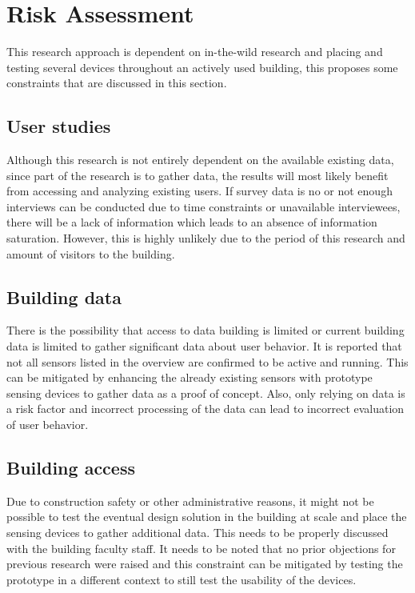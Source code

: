 \section{Risk Assessment}

This research approach is dependent on in-the-wild research and placing and testing several devices throughout an actively used building, this proposes some constraints that are discussed in this section.

\subsection{User studies}

Although this research is not entirely dependent on the available existing data, since part of the research is to gather data, the results will most likely benefit from accessing and analyzing existing users. If survey data is no or not enough interviews can be conducted due to time constraints or unavailable interviewees, there will be a lack of information which leads to an absence of information saturation. However, this is highly unlikely due to the period of this research and amount of visitors to the building.

\subsection{Building data}

There is the possibility that access to data building is limited or current building data is limited to gather significant data about user behavior. It is reported that not all sensors listed in the overview are confirmed to be active and running. This can be mitigated by enhancing the already existing sensors with prototype sensing devices to gather data as a proof of concept. Also, only relying on data is a risk factor and incorrect processing of the data can lead to incorrect evaluation of user behavior.

\subsection{Building access}

Due to construction safety or other administrative reasons, it might not be possible to test the eventual design solution in the building at scale and place the sensing devices to gather additional data. This needs to be properly discussed with the building faculty staff. It needs to be noted that no prior objections for previous research were raised and this constraint can be mitigated by testing the prototype in a different context to still test the usability of the devices.

